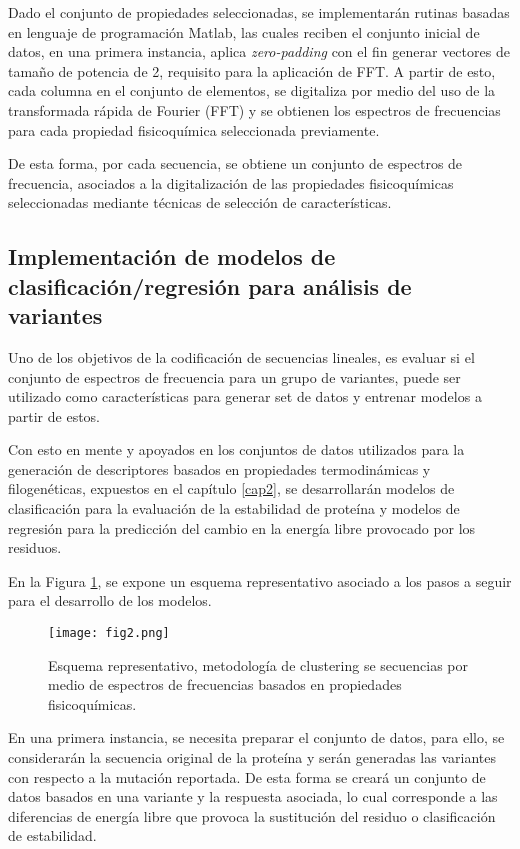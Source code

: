 Dado el conjunto de propiedades seleccionadas, se implementarán rutinas basadas en lenguaje de programación Matlab, las cuales reciben el conjunto inicial de datos, en una primera instancia, aplica \textit{zero-padding} con el fin generar vectores de tamaño de potencia de 2, requisito para la aplicación de FFT. A partir de esto, cada columna en el conjunto de elementos, se digitaliza por medio del uso de la transformada rápida de Fourier (FFT) y se obtienen los espectros de frecuencias para cada propiedad fisicoquímica seleccionada previamente.

De esta forma, por cada secuencia, se obtiene un conjunto de espectros de frecuencia, asociados a la digitalización de las propiedades fisicoquímicas seleccionadas mediante técnicas de selección de características.

\subsection{Implementación de modelos de clasificación/regresión para análisis de variantes}

Uno de los objetivos de la codificación de secuencias lineales, es evaluar si el conjunto de espectros de frecuencia para un grupo de variantes, puede ser utilizado como características para generar set de datos y entrenar modelos a partir de estos.

Con esto en mente y apoyados en los conjuntos de datos utilizados para la generación de descriptores basados en propiedades termodinámicas y filogenéticas, expuestos en el capítulo \ref{cap2}, se desarrollarán modelos de clasificación para la evaluación de la estabilidad de proteína y modelos de regresión para la predicción del cambio en la energía libre provocado por los residuos.

En la Figura \ref{cap3:fig3}, se expone un esquema representativo asociado a los pasos a seguir para el desarrollo de los modelos.

\begin{figure}[!h]
	
	\centering
	\texttt{[image: fig2.png]}
	\caption{Esquema representativo, metodología de clustering se secuencias por medio de espectros de frecuencias basados en propiedades fisicoquímicas.}
	\label{cap3:fig3}
\end{figure}


En una primera instancia, se necesita preparar el conjunto de datos, para ello, se considerarán la secuencia original de la proteína y serán generadas las variantes con respecto a la mutación reportada. De esta forma se creará un conjunto de datos basados en una variante y la respuesta asociada, lo cual corresponde a las diferencias de energía libre que provoca la sustitución del residuo o clasificación de estabilidad.

